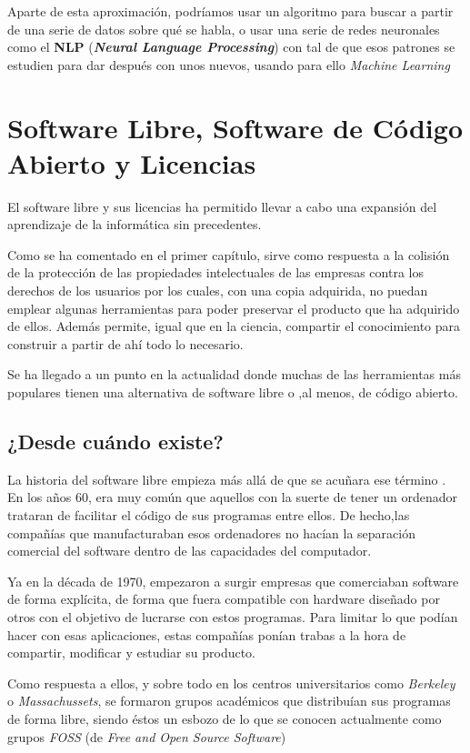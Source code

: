 Aparte de esta aproximación, podríamos usar un algoritmo para buscar a partir de una serie de datos sobre qué se habla, o usar una serie de redes neuronales como el \textbf{NLP} (\textit{\textbf{Neural Language Processing}}) con tal de que esos patrones se estudien para dar después con unos nuevos, usando para ello \textit{Machine Learning} \cite{chatbots-architecture}

\section{Software Libre, Software de Código Abierto y Licencias}
El software libre y sus licencias \cite{gplv3} ha permitido llevar a cabo una expansión del aprendizaje de la informática sin precedentes. 

Como se ha comentado en el primer capítulo, sirve como respuesta a la colisión de la protección de las propiedades intelectuales de las empresas contra los derechos de los usuarios por los cuales, con una copia adquirida, no puedan emplear algunas herramientas para poder preservar el producto que ha adquirido de ellos. Además permite, igual que en la ciencia, compartir el conocimiento para construir a partir de ahí todo lo necesario.

Se ha llegado a un punto en la actualidad donde muchas de las herramientas más populares tienen una alternativa de software libre o ,al menos, de código abierto.

\subsection{¿Desde cuándo existe?}
La historia del software libre empieza más allá de que se acuñara ese término \cite{foss-history}. En los años 60, era muy común que aquellos con la suerte de tener un ordenador trataran de facilitar el código de sus programas entre ellos. De hecho,las compañías que manufacturaban esos ordenadores no hacían la separación comercial del software dentro de las capacidades del computador.

Ya en la década de 1970, empezaron a surgir empresas que comerciaban software de forma explícita, de forma que fuera compatible con hardware diseñado por otros con el objetivo de lucrarse con estos programas. Para limitar lo que podían hacer con esas aplicaciones, estas compañías ponían trabas a la hora de compartir, modificar y estudiar su producto.

Como respuesta a ellos, y sobre todo en los centros universitarios como \textit{Berkeley} o \textit{Massachussets}, se formaron grupos académicos que distribuían sus programas de forma libre, siendo éstos un esbozo de lo que se conocen actualmente como grupos \textit{FOSS} (de \textit{Free and Open Source Software}) 

